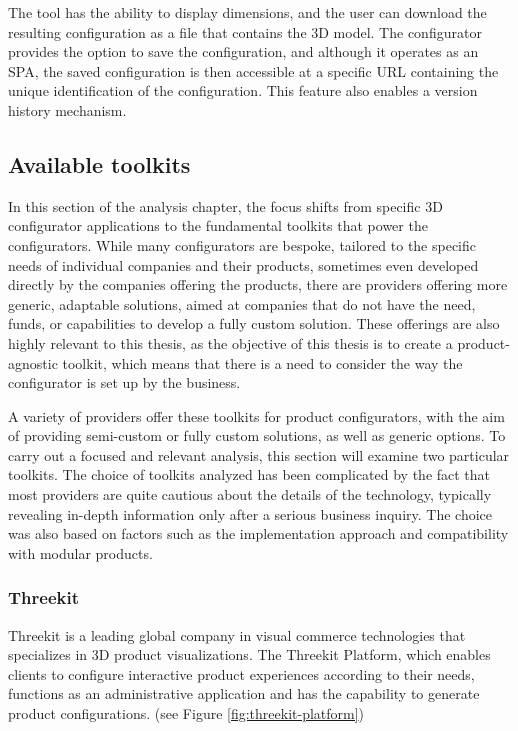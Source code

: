The tool has the ability to display dimensions, and the user can download the resulting configuration as a file that contains the 3D model. The configurator provides the option to save the configuration, and although it operates as an SPA, the saved configuration is then accessible at a specific URL containing the unique identification of the configuration. This feature also enables a version history mechanism.

\subsection{Available toolkits}

In this section of the analysis chapter, the focus shifts from specific 3D configurator applications to the fundamental toolkits that power the configurators. While many configurators are bespoke, tailored to the specific needs of individual companies and their products, sometimes even developed directly by the companies offering the products, there are providers offering more generic, adaptable solutions, aimed at companies that do not have the need, funds, or capabilities to develop a fully custom solution. These offerings are also highly relevant to this thesis, as the objective of this thesis is to create a product-agnostic toolkit, which means that there is a need to consider the way the configurator is set up by the business.

A variety of providers offer these toolkits for product configurators, with the aim of providing semi-custom or fully custom solutions, as well as generic options. To carry out a focused and relevant analysis, this section will examine two particular toolkits. The choice of toolkits analyzed has been complicated by the fact that most providers are quite cautious about the details of the technology, typically revealing in-depth information only after a serious business inquiry. The choice was also based on factors such as the implementation approach and compatibility with modular products.

\subsubsection{Threekit}

Threekit is a leading global company in visual commerce technologies that specializes in 3D product visualizations. The Threekit Platform, which enables clients to configure interactive product experiences according to their needs, functions as an administrative application and has the capability to generate product configurations. (see Figure \ref{fig:threekit-platform}) \cite{ThreeKitAboutUs} \cite{ThreeKitPlatform}

